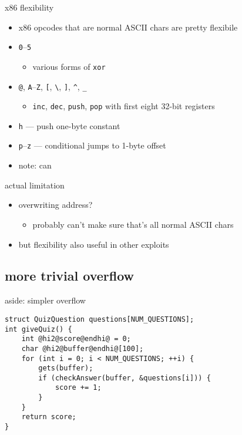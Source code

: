 
\begin{frame}{x86 flexibility}
    \begin{itemize}
    \item x86 opcodes that are normal ASCII chars are pretty flexibile
    \item {\tt 0}--{\tt 5}
        \begin{itemize}
        \item various forms of {\tt xor}
        \end{itemize}
    \item {\tt @}, {\tt A}--{\tt Z}, {\tt [}, {\tt \textbackslash}, {\tt ]}, {\tt \textasciicircum}, {\tt \_}
        \begin{itemize}
        \item {\tt inc}, {\tt dec}, {\tt push}, {\tt pop} with first eight 32-bit registers
        \end{itemize}
    \item {\tt h} --- push one-byte constant
    \item {\tt p}--{\tt z} --- conditional jumps to 1-byte offset
    \vspace{.5cm}
    \item<2> note: can 
    \end{itemize}
\end{frame}

\begin{frame}{actual limitation}
    \begin{itemize}
    \item overwriting address? 
        \begin{itemize}
        \item probably can't make sure that's all normal ASCII chars
        \end{itemize}
    \item but flexibility also useful in other exploits
    \end{itemize}
\end{frame}

\subsection{more trivial overflow}

\begin{frame}[fragile,label=overwriteLocal]{aside: simpler overflow}
\begin{lstlisting}
struct QuizQuestion questions[NUM_QUESTIONS];
int giveQuiz() {
    int @hi2@score@endhi@ = 0;
    char @hi2@buffer@endhi@[100];
    for (int i = 0; i < NUM_QUESTIONS; ++i) {
        gets(buffer);
        if (checkAnswer(buffer, &questions[i])) {
            score += 1;
        }
    }
    return score;
}
\end{lstlisting}
\end{frame}

